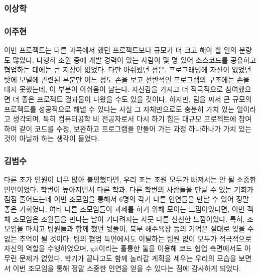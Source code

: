 \documentclass[10pt,oneside,a4paper,titlepage]{article}
\begin{document}
\subsubsection{이상학}

\subsubsection{이주현}

이번 프로젝트는 다른 과목에서 했던 프로젝트보다 규모가 더 크고 해야 할 일의 분량도 많았다. 다행히 조원 중에 개발 경력이 있는 사람이 몇 명 있어 소스코드를 공유하고 협업하는 데에는 큰 지장이 없었다. 다만 아쉬웠던 점은, 프로그래밍에 자신이 없었던 탓에 모델에 관련된 부분만 어느 정도 손을 보고 전반적인 프로그램의 구조에는 손을 대지 못했는데, 이 부분이 아쉬움이 남는다. 자신감을 가지고 더 적극적으로 참여했으면 더 좋은 프로젝트 결과물이 나왔을 수도 있을 것이다.
하지만, 팀을 짜서 큰 규모의 프로젝트를 성공적으로 해낼 수 있다는 사실 그 자체만으로도 충분히 가치 있는 일이라고 생각되며, 특히 컴퓨터공학 비 전공자로서 다시 하기 힘든 대규모 프로젝트에 참여하여 같이 코드를 수정, 보완하고 프로그램을 만들어 가는 과정 하나하나가 가치 있는 것이 아닐까 하는 생각이 들었다. 

\subsubsection{김범수}

다른 조가 인원이 너무 많아 불평했다면, 우리 조는 조원 모두가 빠져서는 안 될 소중한 인연이었다. 학번이 높아지면서 다른 학과, 다른 학번의 사람들을 만날 수 있는 기회가 점점 줄어드는데 이번 조모임을 통해서 6명의 각기 다른 인연들을 만날 수 있어 정말 좋은 기회였다. 여타 다른 조모임들이 과제를 하기 위해 모이는 느낌이었다면, 이번 객체 조모임은 조원들을 만나는 날이 기다려지는 사뭇 다른 신선한 느낌이었다. 특히, 조모임을 마치고 팀원들과 함께 했던 뒷풀이, 북부 해수욕장 등의 기억은 절대로 잊을 수 없는 추억이 될 것이다. 팀의 협업 특면에서도 이탈하는 팀원 없이 모두가 적극적으로 자신의 역할을 수행하였으며, git이라는 훌륭한 툴을 이용해 코드 협업 측면에서도 아무런 문제가 없었다. 학기가 끝나고도 함께 놀러갈 계획을 세우는 우리의 모습을 보면서 이번 조모임을 통해 정말 소중한 인연을 얻을 수 있다는 점에 감사하게 되었다.
\end{document}
